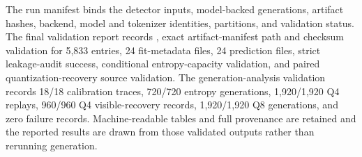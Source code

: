 \documentclass[fleqn,10pt]{wlscirep}
\begin{document}
The run manifest binds the detector inputs, model-backed generations, artifact hashes, backend, model and tokenizer identities, partitions, and validation status. The final validation report records , exact artifact-manifest path and checksum validation for 5,833 entries, 24 fit-metadata files, 24 prediction files, strict leakage-audit success, conditional entropy-capacity validation, and paired quantization-recovery source validation. The generation-analysis validation records 18/18 calibration traces, 720/720 entropy generations, 1,920/1,920 Q4 replays, 960/960 Q4 visible-recovery records, 1,920/1,920 Q8 generations, and zero failure records. Machine-readable tables and full provenance are retained and the reported results are drawn from those validated outputs rather than rerunning generation.
\end{document}
